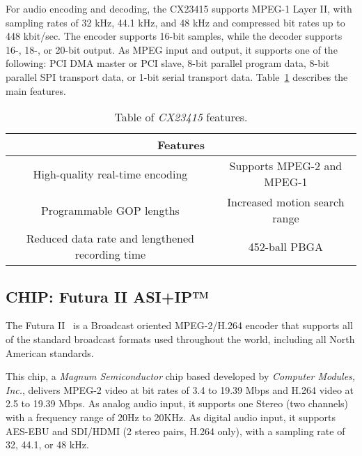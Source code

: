 
For audio encoding and decoding, the CX23415 supports MPEG-1 Layer II, with sampling rates of 32 kHz, 44.1 kHz, and 48 kHz and compressed bit rates up to 448 kbit/sec. The encoder supports 16-bit samples, while the decoder supports 16-, 18-, or 20-bit output.
As MPEG input and output, it supports one of the following: PCI DMA master or PCI slave, 8-bit parallel program data, 8-bit parallel SPI transport data, or 1-bit serial transport data.
Table~\ref{tab:cx} describes the main features.

\begin{table}[h]
    \centering
    \begin{tabular}{|c|c|}
        \hline
        \multicolumn{2}{|c|}{\textbf{Features}} \\
        \hline
         High-quality real-time encoding & Supports MPEG-2 and MPEG-1 \\
         \hline
         Programmable GOP lengths & Increased motion search range \\
         \hline
         Reduced data rate and lengthened recording time & 452-ball PBGA \\
         \hline
    \end{tabular}
    \caption{Table of \textit{CX23415} features.}
    \label{tab:cx}
\end{table}

\subsection{CHIP: Futura II ASI+IP™}

The Futura II~\cite{futura} is a Broadcast oriented MPEG-2/H.264 encoder that supports all of the standard broadcast formats used throughout the world, including all North American standards. 

This chip, a \textit{Magnum Semiconductor} chip based developed by \textit{Computer Modules, Inc.}, delivers MPEG-2 video at bit rates of 3.4 to 19.39 Mbps and H.264 video at 2.5 to 19.39 Mbps.
As analog audio input, it supports one Stereo (two channels) with a frequency range of 20Hz to 20KHz. As digital audio input, it supports AES-EBU and SDI/HDMI (2 stereo pairs, H.264 only), with a sampling rate of 32, 44.1, or 48 kHz.

